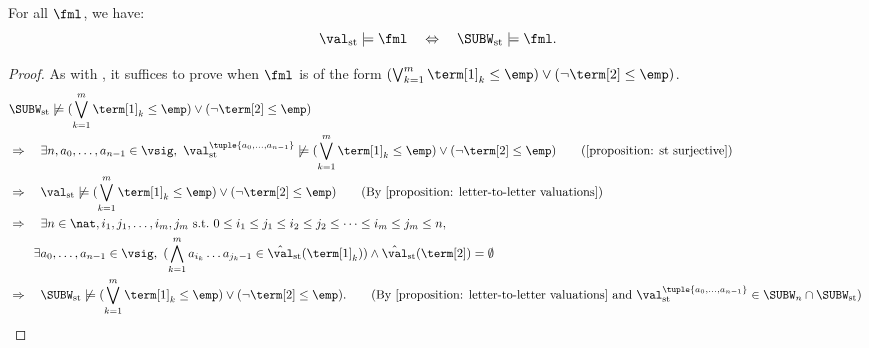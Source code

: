 \begin{lemma}\label{lemma: st lang and SUBW}
       For all  $\fml$, we have:
       \[\val_{\mathrm{st}} \models \fml \quad\Leftrightarrow\quad \SUBW_{\mathrm{st}} \models \fml.\]
\end{lemma}
\begin{proof}
       As with , it suffices to prove when $\fml$ is of the form $(\bigvee_{k = 1}^{m} \term[1]_{k} \le \emp) \lor (\lnot \term[2] \le \emp)$.
      \begin{align*}
              & \SUBW_{\mathrm{st}} \not\models (\bigvee_{k = 1}^{m} \term[1]_{k} \le \emp) \lor (\lnot \term[2] \le \emp)                                                                                                                                    \\
              & \Rightarrow\quad \exists n, a_0, \dots, a_{n-1} \in \vsig,\ 
              \val_{\mathrm{st}}^{\tuple{a_{0}, \dots, a_{n-1}}} \not\models (\bigvee_{k = 1}^{m} \term[1]_{k} \le \emp) \lor (\lnot \term[2] \le \emp)                                                        \tag{\Cref{proposition: st surjective}}      \\
              & \Rightarrow\quad \val_{\mathrm{st}} \not\models (\bigvee_{k = 1}^{m} \term[1]_{k} \le \emp) \lor (\lnot \term[2] \le \emp)        \tag{By \Cref{proposition: letter-to-letter valuations}}                                         \\
              & \Rightarrow\quad \exists n \in \nat, i_1, j_1, \dots, i_m, j_m \mbox{ s.t.\ $0 \le i_1 \le j_1 \le i_2 \le j_2 \le \dots \le i_m \le j_m \le n$},                                                                                    \\
              & \phantom{\Rightarrow\quad} \exists a_{0}, \dots, a_{n-1} \in \vsig,\ (\bigwedge_{k = 1}^{m}  a_{i_k} \dots a_{j_k-1} \in \hat{\val}_{\mathrm{st}}(\term[1]_k)) \land \hat{\val}_{\mathrm{st}}(\term[2]) = \emptyset                   \\
              & \Rightarrow\quad \SUBW_{\mathrm{st}} \not\models (\bigvee_{k = 1}^{m} \term[1]_{k} \le \emp) \lor (\lnot \term[2] \le \emp). \tag*{(By \Cref{proposition: letter-to-letter valuations} and $\val_{\mathrm{st}}^{\tuple{a_0, \dots, a_{n-1}}} \in \SUBW_{n} \cap \SUBW_{\mathrm{st}}$) \qedhere}
       \end{align*}
\end{proof}

